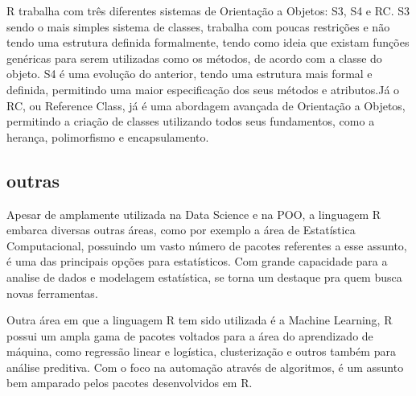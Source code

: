         R trabalha com três diferentes sistemas de Orientação a Objetos: S3, S4 e RC. S3 sendo o mais simples sistema de classes, trabalha com poucas restrições e não tendo uma estrutura definida formalmente, tendo como ideia que existam funções genéricas para serem utilizadas como os métodos, de acordo com a classe do objeto. S4 é uma evolução do anterior, tendo uma estrutura mais formal e definida, permitindo uma maior especificação dos seus métodos e atributos.Já o RC, ou Reference Class, já é uma abordagem avançada de Orientação a Objetos, permitindo a criação de classes utilizando todos seus fundamentos, como a herança, polimorfismo e encapsulamento.

        \subsection{ outras} 
        Apesar de amplamente utilizada na Data Science e na POO, a linguagem R embarca diversas outras áreas, como por exemplo a área de Estatística Computacional, possuindo um vasto número de pacotes referentes a esse assunto, é uma das principais opções para estatísticos. Com grande capacidade para a analise de dados e modelagem estatística, se torna um destaque pra quem busca novas ferramentas.
        
        Outra área em que a linguagem R tem sido utilizada é a Machine Learning, R possui um ampla gama de pacotes voltados para a área do aprendizado de máquina, como regressão linear e logística, clusterização e outros também para análise preditiva. Com o foco na automação através de algoritmos, é um assunto bem amparado pelos pacotes desenvolvidos em R.
        